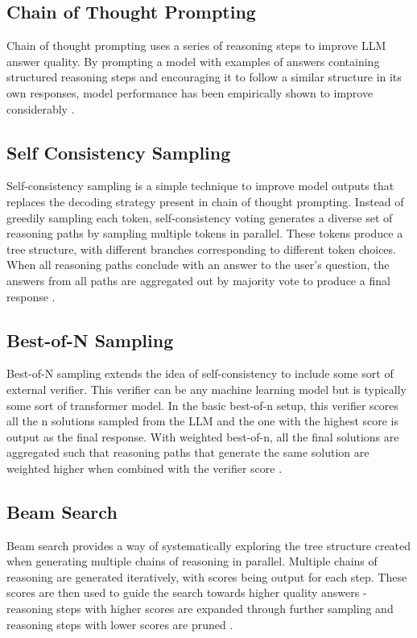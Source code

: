 \documentclass[11pt,twoside]{report}
\begin{document}
\subsection{Chain of Thought Prompting}
Chain of thought prompting uses a series of reasoning steps to improve LLM answer quality.  
By prompting a model with examples of answers containing structured reasoning steps and encouraging it to follow a similar structure in its own responses, model performance has been empirically shown to improve considerably \cite{wei2022chain}.

\subsection{Self Consistency Sampling}
Self-consistency sampling is a simple technique to improve model outputs that replaces the decoding strategy present in chain of thought prompting.
Instead of greedily sampling each token, self-consistency voting generates a diverse set of reasoning paths by sampling multiple tokens in parallel.
These tokens produce a tree structure, with different branches corresponding to different token choices.
When all reasoning paths conclude with an answer to the user's question, the answers from all paths are aggregated out by majority vote to produce a final response \cite{wang2022self}.

\subsection{Best-of-N Sampling}
Best-of-N sampling extends the idea of self-consistency to include some sort of external verifier.
This verifier can be any machine learning model but is typically some sort of transformer model.
In the basic best-of-n setup, this verifier scores all the n solutions sampled from the LLM and the one with the highest score is output as the final response.
With weighted best-of-n, all the final solutions are aggregated such that reasoning paths that generate the same solution are weighted higher when combined with the verifier score \cite{stiennon2020learning}.  

\subsection{Beam Search}
Beam search provides a way of systematically exploring the tree structure created when generating multiple chains of reasoning in parallel. 
Multiple chains of reasoning are generated iteratively, with scores being output for each step.
These scores are then used to guide the search towards higher quality answers - reasoning steps with higher scores are expanded through further sampling and reasoning steps with lower scores are pruned \cite{feng2023alphazero} \cite{yao2023tree}. 
\end{document}

